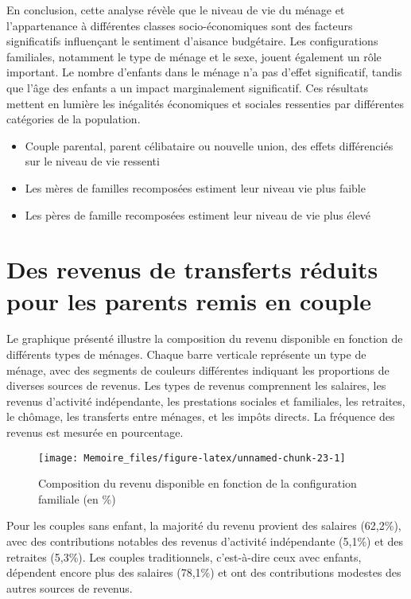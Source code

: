 \documentclass[
  12pt,
]{book}
\begin{document}
En conclusion, cette analyse révèle que le niveau de vie du ménage et
l'appartenance à différentes classes socio-économiques sont des facteurs
significatifs influençant le sentiment d'aisance budgétaire. Les
configurations familiales, notamment le type de ménage et le sexe,
jouent également un rôle important. Le nombre d'enfants dans le ménage
n'a pas d'effet significatif, tandis que l'âge des enfants a un impact
marginalement significatif. Ces résultats mettent en lumière les
inégalités économiques et sociales ressenties par différentes catégories
de la population.

\begin{itemize}
\item
  Couple parental, parent célibataire ou nouvelle union, des effets
  différenciés sur le niveau de vie ressenti
\item
  Les mères de familles recomposées estiment leur niveau vie plus faible
\item
  Les pères de famille recomposées estiment leur niveau de vie plus
  élevé
\end{itemize}

\section{Des revenus de transferts réduits pour les parents remis en
couple}\label{des-revenus-de-transferts-ruxe9duits-pour-les-parents-remis-en-couple}

Le graphique présenté illustre la composition du revenu disponible en
fonction de différents types de ménages. Chaque barre verticale
représente un type de ménage, avec des segments de couleurs différentes
indiquant les proportions de diverses sources de revenus. Les types de
revenus comprennent les salaires, les revenus d'activité indépendante,
les prestations sociales et familiales, les retraites, le chômage, les
transferts entre ménages, et les impôts directs. La fréquence des
revenus est mesurée en pourcentage.

\begin{figure}[h]

{\centering \texttt{[image: Memoire\_files/figure-latex/unnamed-chunk-23-1]} 

}

\caption{Composition du revenu disponible en fonction de la configuration familiale (en \%)}\label{fig:unnamed-chunk-23}
\end{figure}

Pour les couples sans enfant, la majorité du revenu provient des
salaires (62,2\%), avec des contributions notables des revenus
d'activité indépendante (5,1\%) et des retraites (5,3\%). Les couples
traditionnels, c'est-à-dire ceux avec enfants, dépendent encore plus des
salaires (78,1\%) et ont des contributions modestes des autres sources
de revenus.
\end{document}
